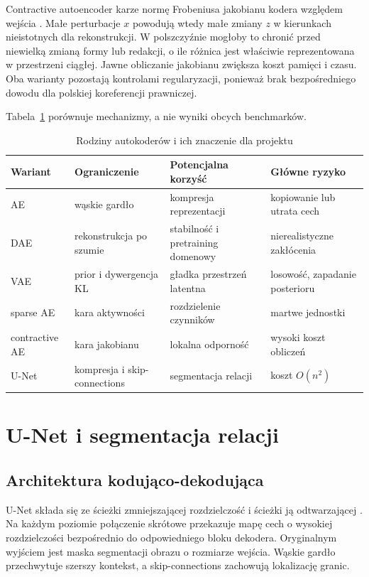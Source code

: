 Contractive autoencoder karze normę Frobeniusa jakobianu kodera względem wejścia \cite{rifai_2011_contractive}. Małe perturbacje $x$ powodują wtedy małe zmiany $z$ w kierunkach nieistotnych dla rekonstrukcji. W polszczyźnie mogłoby to chronić przed niewielką zmianą formy lub redakcji, o ile różnica jest właściwie reprezentowana w przestrzeni ciągłej. Jawne obliczanie jakobianu zwiększa koszt pamięci i czasu. Oba warianty pozostają kontrolami regularyzacji, ponieważ brak bezpośredniego dowodu dla polskiej koreferencji prawniczej.

Tabela~\ref{tab:rodziny-ae} porównuje mechanizmy, a nie wyniki obcych benchmarków.

\begin{table}[htbp]
  \centering
  \caption{Rodziny autokoderów i ich znaczenie dla projektu}
  \label{tab:rodziny-ae}
  \begin{tabular}{p{}p{}p{}p{}}
    \toprule
    Wariant & Ograniczenie & Potencjalna korzyść & Główne ryzyko \\
    \midrule
    AE & wąskie gardło & kompresja reprezentacji & kopiowanie lub utrata cech \\
    DAE & rekonstrukcja po szumie & stabilność i pretraining domenowy & nierealistyczne zakłócenia \\
    VAE & prior i dywergencja KL & gładka przestrzeń latentna & losowość, zapadanie posterioru \\
    sparse AE & kara aktywności & rozdzielenie czynników & martwe jednostki \\
    contractive AE & kara jakobianu & lokalna odporność & wysoki koszt obliczeń \\
    U-Net & kompresja i skip-connections & segmentacja relacji & koszt $O(n^2)$ \\
    \bottomrule
  \end{tabular}
\end{table}

\section{U-Net i segmentacja relacji}
\label{sec:unet-relacje}

\subsection{Architektura kodująco-dekodująca}

U-Net składa się ze ścieżki zmniejszającej rozdzielczość i ścieżki ją odtwarzającej \cite{ronneberger_2015_unet}. Na każdym poziomie połączenie skrótowe przekazuje mapę cech o wysokiej rozdzielczości bezpośrednio do odpowiedniego bloku dekodera. Oryginalnym wyjściem jest maska segmentacji obrazu o rozmiarze wejścia. Wąskie gardło przechwytuje szerszy kontekst, a skip-connections zachowują lokalizację granic.

